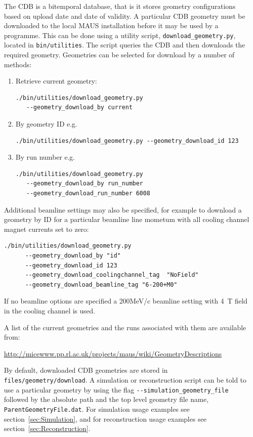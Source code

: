 \documentclass[a4paper,10pt]{article}
\begin{document}
The CDB is a bitemporal database, that is it stores geometry configurations based on upload date and date of validity.  A particular CDB geometry must be downloaded to the local MAUS installation before it may be used by a programme.  This can be done using a utility script, \texttt{download\_geometry.py}, located in \texttt{bin/utilities}.  The script queries the CDB and then downloads the required geometry.  Geometries can be selected for download by a number of methods:

\begin{enumerate}
  \item Retrieve current geometry:
  \begin{lstlisting}
./bin/utilities/download_geometry.py
   --geometry_download_by current
  \end{lstlisting}
  \item By geometry ID  e.g. 
    \begin{lstlisting}
./bin/utilities/download_geometry.py --geometry_download_id 123
    \end{lstlisting}
  \item By run number e.g.
  \begin{lstlisting}
./bin/utilities/download_geometry.py
   --geometry_download_by run_number
   --geometry_download_run_number 6008
  \end{lstlisting}
\end{enumerate}

Additional beamline settings may also be specified, for example to download a geometry by ID for a particular beamline line mometum with all cooling channel magnet currents set to zero:

\begin{lstlisting}
./bin/utilities/download_geometry.py 
      --geometry_download_by "id" 
      --geometry_download_id 123
      --geometry_download_coolingchannel_tag  "NoField" 
      --geometry_download_beamline_tag "6-200+M0" 
\end{lstlisting}

If no beamline options are specified a 200MeV/c beamline setting with 4~T field in the cooling channel is used.

A list of the current geometries and the runs associated with them are available from:

    \medskip
    \url{http://micewww.pp.rl.ac.uk/projects/maus/wiki/GeometryDescriptions}
    \medskip

By default, downloaded CDB geometries are stored in \texttt{files/geometry/download}.  A simulation or reconstruction script can be told to use a particular geometry by using the flag \texttt{-{}-simulation\_geometry\_file} followed by the absolute path and the top level geometry file name, \texttt{ParentGeometryFile.dat}. For simulation usage examples see section~\ref{sec:Simulation}, and for reconstruction usage examples see section~\ref{sec:Reconstruction}.
\end{document}
